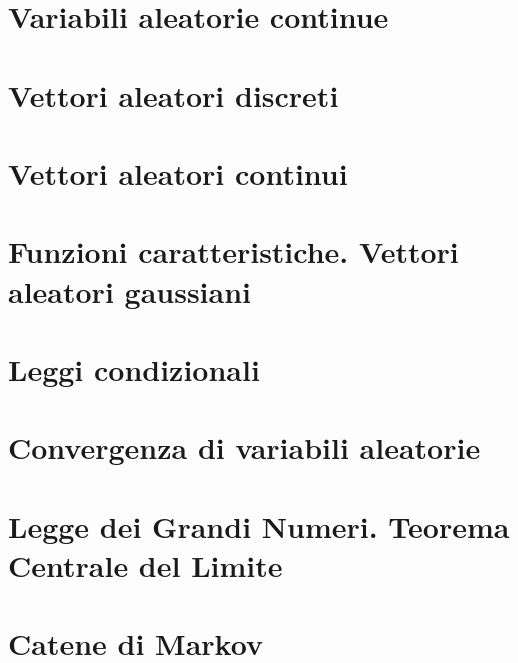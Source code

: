 \documentclass[11pt,a4paper,twoside,openright]{book}
\begin{document}
\chapter{Variabili aleatorie continue}


\chapter{Vettori aleatori discreti}


\chapter{Vettori aleatori continui}


\chapter{Funzioni caratteristiche. Vettori aleatori gaussiani}


\chapter{Leggi condizionali}


\chapter{Convergenza di variabili aleatorie}


\chapter{Legge dei Grandi Numeri. Teorema Centrale del Limite}


\chapter{Catene di Markov}

\end{document}
